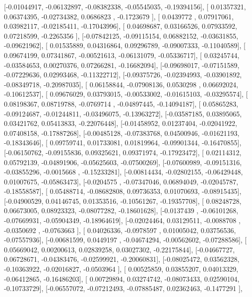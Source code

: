 \documentclass{article}
\begin{document}
       [-0.01044917, -0.06132897, -0.08382338, -0.05545035, -0.19394156],
       [ 0.01357321,  0.06374395, -0.02734382,  0.0686823 , -0.1723679 ],
       [ 0.0439772 ,  0.07917061,  0.03982117, -0.02185411, -0.17043996],
       [ 0.04698687,  0.03166526,  0.07933592,  0.07218599, -0.2265356 ],
       [-0.07842125, -0.09115154,  0.06882152, -0.03631855, -0.09621962],
       [ 0.01535889,  0.04316864,  0.09296789, -0.09007333, -0.11040589],
       [ 0.09674199,  0.07341867, -0.00521613, -0.06131079, -0.05336717],
       [ 0.03245744, -0.03584653,  0.00270376,  0.07266281, -0.16682094],
       [-0.09698017, -0.07151589, -0.07229636,  0.02993468, -0.11322712],
       [-0.09375726, -0.02394993, -0.03901892, -0.08349718, -0.20987035],
       [ 0.06158844, -0.07908136,  0.0530298 ,  0.06692024, -0.10612537],
       [ 0.09676029,  0.03793015, -0.00533002, -0.01615103, -0.03295574],
       [ 0.08198367,  0.08719788, -0.0769714 , -0.04897445, -0.14094187],
       [ 0.05865283, -0.09124687, -0.01244811, -0.03496075, -0.13963272],
       [-0.03587185,  0.03895065,  0.03421762,  0.05413833, -0.22076448],
       [-0.01458952,  0.01237404, -0.02041922,  0.07408158, -0.17887268],
       [-0.00485128, -0.07383768,  0.04500946, -0.01621193, -0.18343646],
       [ 0.09759741,  0.01733081,  0.01819964, -0.09901344, -0.16470855],
       [-0.06150762, -0.09155836,  0.09325621,  0.09371974, -0.17923472],
       [ 0.02114312,  0.05792139, -0.04891906, -0.05625603, -0.07500269],
       [-0.07600989, -0.09151316, -0.03855296, -0.0015668 , -0.15233281],
       [-0.00814434, -0.02802155, -0.06429448,  0.01007675, -0.05863473],
       [-0.0204575 , -0.07347046,  0.06894049, -0.02045787, -0.18558587],
       [ 0.05488714, -0.08682808,  0.09736353,  0.01070693, -0.08915435],
       [-0.04900529,  0.04146745,  0.01353516, -0.10561267, -0.19357708],
       [ 0.08248728,  0.06673005,  0.08923323, -0.08077282, -0.18601628],
       [-0.0137439 , -0.06101268, -0.07669931, -0.05904349, -0.18964619],
       [-0.02024464,  0.03129511, -0.0088708 , -0.0350692 , -0.0763663 ],
       [ 0.04026336, -0.0978597 ,  0.01005042,  0.03756536, -0.07557936],
       [-0.00681599,  0.0449197 , -0.04674294, -0.00562602, -0.07288586],
       [ 0.05669042,  0.00200613,  0.02839258,  0.03027302, -0.22175844],
       [-0.04667727,  0.06728671, -0.04383476, -0.02599921, -0.20060831],
       [-0.08025472,  0.03562328, -0.10363922, -0.02016827, -0.0503964 ],
       [ 0.00525859,  0.03855207,  0.04013329, -0.06412865, -0.16486203],
       [ 0.00729894,  0.03274742, -0.08073433,  0.02590104, -0.10733729],
       [-0.06557072, -0.07212493, -0.07885487,  0.02362463, -0.1477291 ],
\end{document}
